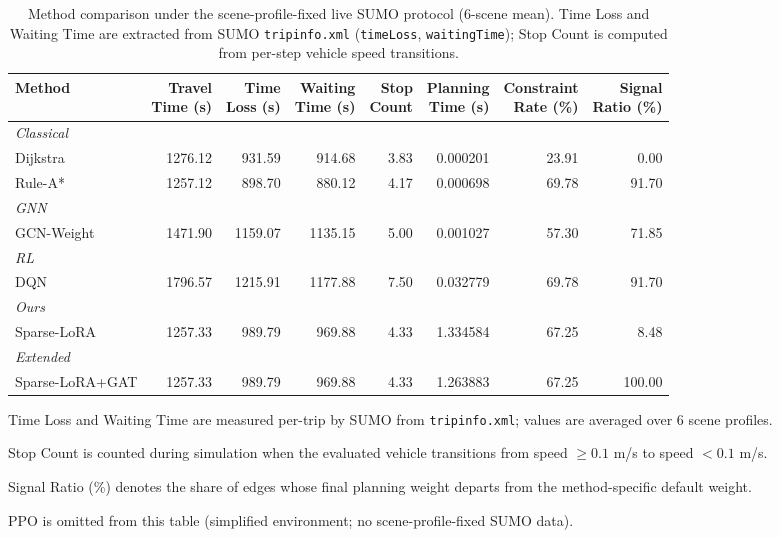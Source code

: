 
\begin{table}[t]
\centering
\caption{Method comparison under the scene-profile-fixed live SUMO protocol (6-scene mean). Time Loss and Waiting Time are extracted from SUMO \texttt{tripinfo.xml} (\texttt{timeLoss}, \texttt{waitingTime}); Stop Count is computed from per-step vehicle speed transitions.}
\label{tab:method_comparison_with_timeloss}
\small
\begin{threeparttable}
\begin{tabular}{lrrrrrrr}
\toprule
Method & \makecell{Travel\\Time (s)} & \makecell{Time\\Loss (s)} & \makecell{Waiting\\Time (s)} & \makecell{Stop\\Count} & \makecell{Planning\\Time (s)} & \makecell{Constraint\\Rate (\%)} & \makecell{Signal\\Ratio (\%)} \\
\midrule
\multicolumn{8}{l}{\textit{Classical}} \\
Dijkstra & 1276.12 & 931.59 & 914.68 & 3.83 & 0.000201 & 23.91 & 0.00 \\
Rule-A* & 1257.12 & 898.70 & 880.12 & 4.17 & 0.000698 & 69.78 & 91.70 \\
\midrule
\multicolumn{8}{l}{\textit{GNN}} \\
GCN-Weight & 1471.90 & 1159.07 & 1135.15 & 5.00 & 0.001027 & 57.30 & 71.85 \\
\midrule
\multicolumn{8}{l}{\textit{RL}} \\
DQN & 1796.57 & 1215.91 & 1177.88 & 7.50 & 0.032779 & 69.78 & 91.70 \\
\midrule
\multicolumn{8}{l}{\textit{Ours}} \\
Sparse-LoRA & 1257.33 & 989.79 & 969.88 & 4.33 & 1.334584 & 67.25 & 8.48 \\
\midrule
\multicolumn{8}{l}{\textit{Extended}} \\
Sparse-LoRA+GAT & 1257.33 & 989.79 & 969.88 & 4.33 & 1.263883 & 67.25 & 100.00 \\
\bottomrule
\end{tabular}
\begin{tablenotes}[flushleft]
\footnotesize
\item Time Loss and Waiting Time are measured per-trip by SUMO from \texttt{tripinfo.xml}; values are averaged over 6 scene profiles.
\item Stop Count is counted during simulation when the evaluated vehicle transitions from speed $\geq 0.1$ m/s to speed $< 0.1$ m/s.
\item Signal Ratio (\%) denotes the share of edges whose final planning weight departs from the method-specific default weight.
\item PPO is omitted from this table (simplified environment; no scene-profile-fixed SUMO data).
\end{tablenotes}
\end{threeparttable}
\end{table}
